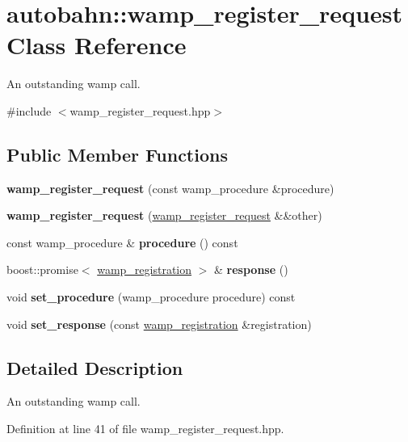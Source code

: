 \hypertarget{classautobahn_1_1wamp__register__request}{}\section{autobahn\+:\+:wamp\+\_\+register\+\_\+request Class Reference}
\label{classautobahn_1_1wamp__register__request}


An outstanding wamp call.  




{\ttfamily \#include $<$wamp\+\_\+register\+\_\+request.\+hpp$>$}

\subsection*{Public Member Functions}
\begin{DoxyCompactItemize}
\item 
{\bfseries wamp\+\_\+register\+\_\+request} (const wamp\+\_\+procedure \&procedure)\hypertarget{classautobahn_1_1wamp__register__request_ae019ff5cc82e3a619cfc4876f486a0e5}{}\label{classautobahn_1_1wamp__register__request_ae019ff5cc82e3a619cfc4876f486a0e5}

\item 
{\bfseries wamp\+\_\+register\+\_\+request} (\hyperlink{classautobahn_1_1wamp__register__request}{wamp\+\_\+register\+\_\+request} \&\&other)\hypertarget{classautobahn_1_1wamp__register__request_aa69652ae23e63517a9095846fe5a8248}{}\label{classautobahn_1_1wamp__register__request_aa69652ae23e63517a9095846fe5a8248}

\item 
const wamp\+\_\+procedure \& {\bfseries procedure} () const \hypertarget{classautobahn_1_1wamp__register__request_af9c802aaf8b675f0ccf2e7bac770432e}{}\label{classautobahn_1_1wamp__register__request_af9c802aaf8b675f0ccf2e7bac770432e}

\item 
boost\+::promise$<$ \hyperlink{classautobahn_1_1wamp__registration}{wamp\+\_\+registration} $>$ \& {\bfseries response} ()\hypertarget{classautobahn_1_1wamp__register__request_aca7447774813e45a99cd829a10c9308d}{}\label{classautobahn_1_1wamp__register__request_aca7447774813e45a99cd829a10c9308d}

\item 
void {\bfseries set\+\_\+procedure} (wamp\+\_\+procedure procedure) const \hypertarget{classautobahn_1_1wamp__register__request_abf3e1cfe0e21ef3e0b659551efb3435e}{}\label{classautobahn_1_1wamp__register__request_abf3e1cfe0e21ef3e0b659551efb3435e}

\item 
void {\bfseries set\+\_\+response} (const \hyperlink{classautobahn_1_1wamp__registration}{wamp\+\_\+registration} \&registration)\hypertarget{classautobahn_1_1wamp__register__request_ab7ae470d8884dffb7d4f5c8345960bb6}{}\label{classautobahn_1_1wamp__register__request_ab7ae470d8884dffb7d4f5c8345960bb6}

\end{DoxyCompactItemize}


\subsection{Detailed Description}
An outstanding wamp call. 

Definition at line 41 of file wamp\+\_\+register\+\_\+request.\+hpp.

